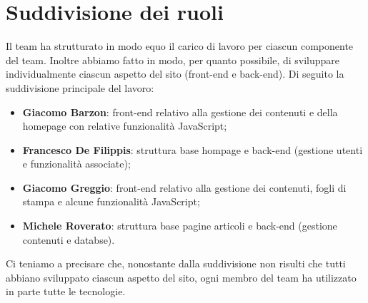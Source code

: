\documentclass[12pt]{article}
\begin{document}
	\section{Suddivisione dei ruoli}
	Il team ha strutturato in modo equo il carico di lavoro per ciascun componente del team. Inoltre abbiamo fatto in modo, per quanto possibile, di sviluppare individualmente ciascun aspetto del sito (front-end e back-end). Di seguito la suddivisione principale del lavoro:
	\begin{itemize}
		\item \textbf{Giacomo Barzon}: front-end relativo alla gestione dei contenuti e della homepage con relative funzionalità JavaScript;
		\item \textbf{Francesco De Filippis}: struttura base hompage e back-end (gestione utenti e funzionalità associate);
		\item \textbf{Giacomo Greggio}: front-end relativo alla gestione dei contenuti, fogli di stampa e alcune funzionalità JavaScript;
		\item \textbf{Michele Roverato}: struttura base pagine articoli e back-end (gestione contenuti e databse).
	\end{itemize}
	Ci teniamo a precisare che, nonostante dalla suddivisione non risulti che tutti abbiano sviluppato ciascun aspetto del sito, ogni membro del team ha utilizzato in parte tutte le tecnologie.
\end{document}
